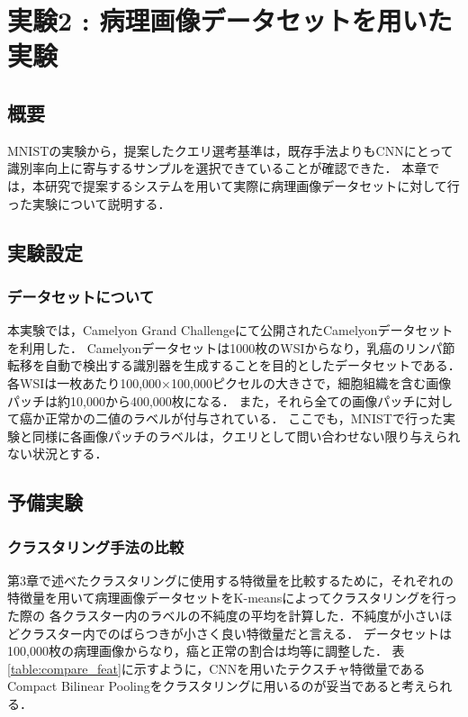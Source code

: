 \chapter{実験2 : 病理画像データセットを用いた実験}
\section{概要}
MNISTの実験から，提案したクエリ選考基準は，既存手法よりもCNNにとって識別率向上に寄与するサンプルを選択できていることが確認できた．
本章では，本研究で提案するシステムを用いて実際に病理画像データセットに対して行った実験について説明する．

\section{実験設定}
\subsection{データセットについて}
本実験では，Camelyon Grand Challenge\cite{Camelyon17}にて公開されたCamelyonデータセットを利用した．
Camelyonデータセットは1000枚のWSIからなり，乳癌のリンパ節転移を自動で検出する識別器を生成することを目的としたデータセットである．
各WSIは一枚あたり100,000×100,000ピクセルの大きさで，細胞組織を含む画像パッチは約10,000から400,000枚になる．
また，それら全ての画像パッチに対して癌か正常かの二値のラベルが付与されている．
ここでも，MNISTで行った実験と同様に各画像パッチのラベルは，クエリとして問い合わせない限り与えられない状況とする．

\section{予備実験}

\subsection{クラスタリング手法の比較}
第3章で述べたクラスタリングに使用する特徴量を比較するために，それぞれの特徴量を用いて病理画像データセットをK-meansによってクラスタリングを行った際の
各クラスター内のラベルの不純度の平均を計算した．不純度が小さいほどクラスター内でのばらつきが小さく良い特徴量だと言える．
データセットは100,000枚の病理画像からなり，癌と正常の割合は均等に調整した．
表\ref{table:compare_feat}に示すように，CNNを用いたテクスチャ特徴量であるCompact Bilinear Poolingをクラスタリングに用いるのが妥当であると考えられる．

